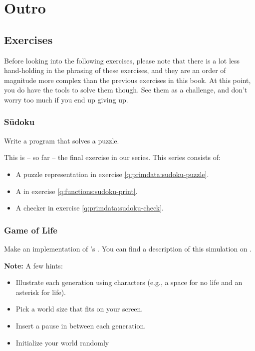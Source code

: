 \chapter{Outro}

\section{Exercises}

Before looking into the following exercises, please note that there is a lot less hand-holding in the phrasing of these exercises, and they are an order of magnitude more complex than the previous exercises in this book. At this point, you do have the tools to solve them though. See them as a challenge, and don't worry too much if you end up giving up.

\subsection{Sūdoku}

Write a program that solves a puzzle.

This is -- so far -- the final exercise in our  series. This series consists of:
\begin{itemize}
  \item A puzzle representation in exercise \ref{q:primdata:sudoku-puzzle}.
  \item A  in exercise \ref{q:functions:sudoku-print}.
  \item A checker in exercise \ref{q:primdata:sudoku-check}.
\end{itemize}

\subsection{Game of Life}

Make an implementation of 's . You can find a description of this simulation on .

\textbf{Note:} A few hints:
\begin{itemize}
  \item Illustrate each generation using characters (e.g., a space for no life and an asterisk for life).
  \item Pick a world size that fits on your screen.
  \item Insert a pause in between each generation.
  \item Initialize your world randomly
\end{itemize}

